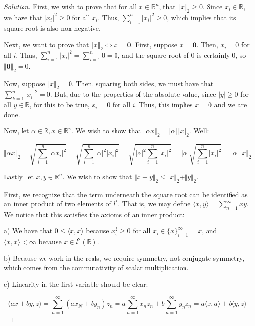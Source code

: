 \documentclass[10pt]{article}
\begin{document}
\begin{proof}[Solution]

First, we wish to prove that for all $x \in \mathbb{R}^n$, that $\Vert x \Vert_2 \geq 0$. Since $x_i \in \mathbb{R}$, we have that $|x_i|^2 \geq 0$ for all $x_i$. Thus, $\sum_{i=1}^n |x_i|^2 \geq 0$, which implies that its square root is also non-negative.

Next, we want to prove that $\Vert x \Vert_2 \iff x = \mathbf{0}$. First, suppose $x = \mathbf{0}$. Then, $x_i = 0$ for all $i$. Thus, $\sum_{i=1}^n |x_i|^2 = \sum_{i=1}^n 0 = 0$, and the square root of 0 is certainly 0, so $\Vert \mathbf{0} \Vert_2 = 0$.

Now, suppose $\Vert x \Vert_2 = 0$. Then, squaring both sides, we must have that $\sum_{k=1}^n |x_i|^2 = 0$. But, due to the properties of the absolute value, since $|y| \geq 0$ for all $y \in \mathbb{R}$, for this to be true, $x_i = 0$ for all $i$. Thus, this implies $x = \mathbf{0}$ and we are done.

Now, let $\alpha \in \mathbb{R}, x \in \mathbb{R}^n$. We wish to show that $\Vert \alpha x \Vert_2 = |\alpha | \Vert x \Vert_2$. Well:

$$ \Vert \alpha x \Vert_2 =  \sqrt{ \sum_{i=1}^n | \alpha x_i |^2} = \sqrt{ \sum_{i=1}^n | \alpha|^2 | x_i |^2} = \sqrt{ |\alpha|^2 \sum_{i=1}^n | x_i |^2} = |\alpha|  \sqrt{ \sum_{i=1}^n |x_i |^2} = |\alpha| \Vert x \Vert_2 $$

Lastly, let $x,y \in \mathbb{R}^n$. We wish to show that $\Vert x + y \Vert_2 \leq \Vert x \Vert_2 + \Vert y \Vert_2$.

First, we recognize that the term underneath the square root can be identified as an inner product of two elements of $l^2$. That is, we may define $\langle x, y \rangle = \sum_{n=1}^\infty xy$. We notice that this satisfies the axioms of an inner product:

a) We have that $ 0 \leq \langle x, x \rangle$ because $x_i^2 \geq 0$ for all $x_i \in \{ x \}_{i=1}^\infty = x$, and $\langle x, x \rangle < \infty$ because $x \in l^2(\mathbb{R})$.

b) Because we work in the reals, we require symmetry, not conjugate symmetry, which comes from the commutativity of scalar multiplication.

c) Linearity in the first variable should be clear:

$$ \langle ax + by, z \rangle = \sum_{n=1}^\infty (ax_N + by_n)z_n = a \sum_{n=1}^\infty x_nz_n + b \sum_{n=1}^\infty y_nz_n = a \langle x,a \rangle  + b \langle y,z \rangle $$


\end{proof}
\end{document}
